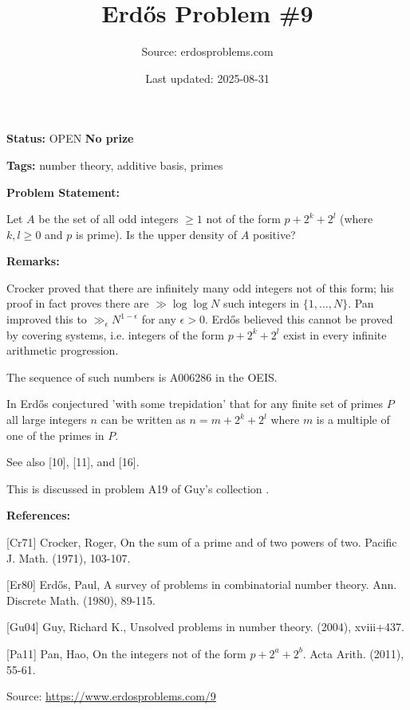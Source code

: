 \documentclass{article}
\title{Erd\H{o}s Problem \#9}
\date{Last updated: 2025-08-31}
\author{Source: erdosproblems.com}
\begin{document}
\maketitle

\noindent\textbf{Status:} OPEN \quad \textbf{No prize}

\noindent\textbf{Tags:} number theory, additive basis, primes

\medskip
\noindent\textbf{Problem Statement:}

Let $A$ be the set of all odd integers $\geq 1$ not of the form $p+2^{k}+2^l$ (where $k,l\geq 0$ and $p$ is prime). Is the upper density of $A$ positive?

\bigskip
\noindent\textbf{Remarks:}

Crocker \cite{Cr71} proved that there are infinitely many odd integers not of this form; his proof in fact proves there are $\gg\log\log N$ such integers in $\{1,\ldots,N\}$. Pan \cite{Pa11} improved this to $\gg_\epsilon N^{1-\epsilon}$ for any $\epsilon>0$. Erd\H{o}s believed this cannot be proved by covering systems, i.e. integers of the form $p+2^k+2^l$ exist in every infinite arithmetic progression.

The sequence of such numbers is A006286 in the OEIS.

In \cite{Er80} Erd\H{o}s conjectured 'with some trepidation' that for any finite set of primes $P$ all large integers $n$ can be written as $n=m+2^k+2^l$ where $m$ is a multiple of one of the primes in $P$.

See also [10], [11], and [16].

This is discussed in problem A19 of Guy's collection \cite{Gu04}.

\bigskip
\noindent\textbf{References:}

[Cr71] Crocker, Roger, On the sum of a prime and of two powers of two. Pacific J. Math. (1971), 103-107.
 
 [Er80] Erd\H{o}s, Paul, A survey of problems in combinatorial number theory. Ann. Discrete Math. (1980), 89-115.
 
 [Gu04] Guy, Richard K., Unsolved problems in number theory. (2004), xviii+437.
 
 [Pa11] Pan, Hao, On the integers not of the form {$p+2^a+2^b$}. Acta Arith. (2011), 55-61.

\bigskip
\noindent\small{Source: \url{https://www.erdosproblems.com/9}}
\end{document}
